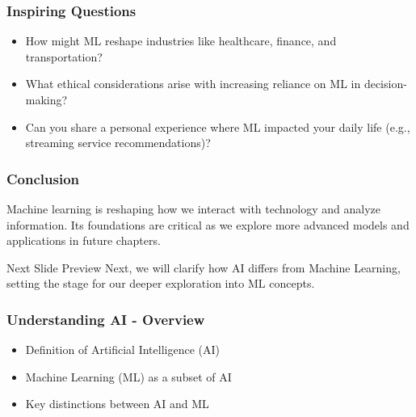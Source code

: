 \documentclass[aspectratio=169]{beamer}
\begin{document}
\begin{frame}[fragile]
    \frametitle{Inspiring Questions}
    \begin{itemize}
        \item How might ML reshape industries like healthcare, finance, and transportation?
        \item What ethical considerations arise with increasing reliance on ML in decision-making?
        \item Can you share a personal experience where ML impacted your daily life (e.g., streaming service recommendations)?
    \end{itemize}
\end{frame}

\begin{frame}[fragile]
    \frametitle{Conclusion}
    Machine learning is reshaping how we interact with technology and analyze information. Its foundations are critical as we explore more advanced models and applications in future chapters.

    \begin{block}{Next Slide Preview}
        Next, we will clarify how AI differs from Machine Learning, setting the stage for our deeper exploration into ML concepts.
    \end{block}
\end{frame}

\begin{frame}[fragile]
    \frametitle{Understanding AI - Overview}
    \begin{itemize}
        \item Definition of Artificial Intelligence (AI)
        \item Machine Learning (ML) as a subset of AI
        \item Key distinctions between AI and ML
    \end{itemize}
\end{frame}
\end{document}
